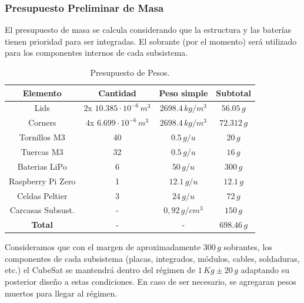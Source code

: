     \subsubsection{Presupuesto Preliminar de Masa}
      El presupuesto de masa se calcula considerando que la estructura y las baterías tienen prioridad para ser
      integradas. El sobrante (por el momento) será utilizado para los componentes internos de cada subsistema.
      \begin{table}[H]
        \centering
        \begin{tabular}{|c|c|c|c|}
          \hline
          \textbf{Elemento} & \textbf{Cantidad}                 & \textbf{Peso simple}  & \textbf{Subtotal} \\ \hline
          Lids              & 2x $10.385 \cdot 10^{-6} \, m^3$  & $2698.4 \, kg/m^3$    & $56.05 \, g$ \\ \hline
          Corners           & 4x $6.699 \cdot 10^{-6} \, m^3$   & $2698.4 \, kg/m^3$    & $72.312 \, g$ \\ \hline
          Tornillos M3      & 40                                & $0.5 \, g/u$          & $20 \, g$ \\ \hline
          Tuercas M3        & 32                                & $0.5 \, g/u$          & $16 \, g$ \\ \hline
          Baterias LiPo     & 6                                 & $50 \, g/u$           & $300 \, g$ \\ \hline
          Raspberry Pi Zero & 1                                 & $12.1 \,g/u$          & $12.1 \, g$ \\ \hline
          Celdas Peltier    & 3                                 & $24 \, g/u$           & $72 \, g$ \\ \hline
          Carcasas Subsust. & -                                 & $0,92 \, g/cm^3$      & $150 \, g$ \\ \hline
          \textbf{Total}    & -                                 & -                     & $698.46 \, g$ \\ \hline
        \end{tabular}
        \caption{Presupuesto de Pesos.}
      \end{table}

      Consideramos que con el margen de aproximadamente $300 \, g$ sobrantes, los componentes de cada subsistema
      (placas, integrados, módulos, cables, soldaduras, etc.) el CubeSat se mantendrá dentro del régimen de $1 \, Kg \pm
      20 \, g$ adaptando su posterior diseño a estas condiciones. En caso de ser necesario, se agregaran pesos
      muertos para llegar al régimen.

